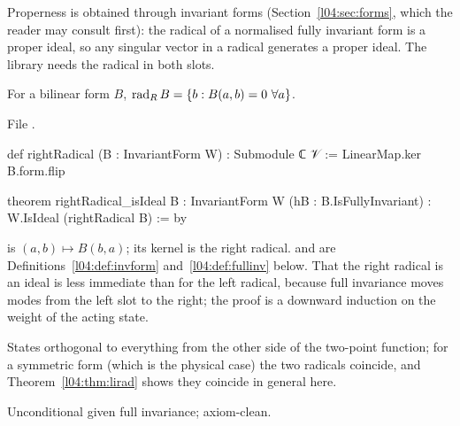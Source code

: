 Properness is obtained through invariant forms (Section~\ref{l04:sec:forms}, which the reader may
consult first): the radical of a normalised fully invariant form is a proper ideal, so any singular
vector in a radical generates a proper ideal. The library needs the radical in both slots.

\begin{definition}\label{l04:def:rightrad}
For a bilinear form $B$, $\operatorname{rad}_R B = \{b : B(a,b) = 0\ \forall a\}$.
\end{definition}
\noindent File .
\begin{leancode}
def rightRadical (B : InvariantForm W) : Submodule ℂ 𝒱 := LinearMap.ker B.form.flip

theorem rightRadical_isIdeal {B : InvariantForm W} (hB : B.IsFullyInvariant) :
    W.IsIdeal (rightRadical B) := by
\end{leancode}
\begin{dictionary}
 is $(a,b)\mapsto B(b,a)$; its kernel is the right radical.  and
 are Definitions~\ref{l04:def:invform} and~\ref{l04:def:fullinv} below. That the
right radical is an ideal is less immediate than for the left radical, because full invariance moves
modes from the left slot to the right; the proof is a downward induction on the weight of the acting
state.
\end{dictionary}
\begin{physics}
States orthogonal to everything from the other side of the two-point function; for a symmetric
form (which is the physical case) the two radicals coincide, and Theorem~\ref{l04:thm:lirad} shows
they coincide in general here.
\end{physics}
\begin{status}
Unconditional given full invariance; axiom-clean.
\end{status}

